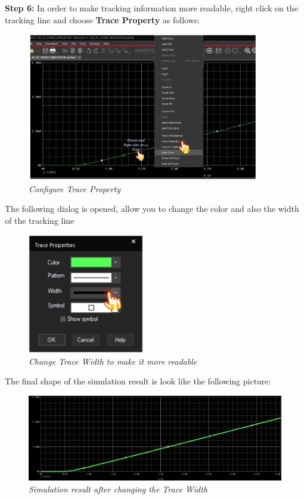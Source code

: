 \textbf{Step 6: } In order to make tracking information more readable, right click on the tracking line and choose \textbf{Trace Property} as follows:
\begin{figure}[!htp]
    \centering
    \includegraphics[width=4in]{source/picture/bai_2/16_ConfigTraceProperty.png}
    \caption{\textit{Configure Trace Property}}
    \label{bai2_pic16}
\end{figure}

The following dialog is opened, allow you to change the color and also the width of the tracking line

\begin{figure}[!htp]
    \centering
    \includegraphics[width=2in]{source/picture/bai_2/17_ChangeWidthTrace.png}
    \caption{\textit{Change Trace Width to make it more readable}}
    \label{bai2_pic17}
\end{figure}
\newpage
The final shape of the simulation result is look like the following picture:

\begin{figure}[!htp]
    \centering
    \includegraphics[width=5.5in]{source/picture/bai_2/18_ResultAfterConfigTrace.png}
    \caption{\textit{Simulation result after changing the Trace Width}}
    \label{bai2_pic18}
\end{figure}

